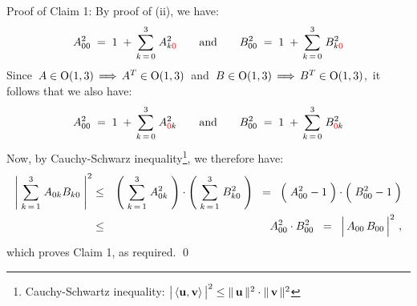 \begin{enumerate}
	\vskip 0.1cm
	\noindent
	Proof of Claim 1:\;\;
	By proof of (ii), we have:
	\begin{equation*}
	A_{{\color{black}0}0}^{2}
	\; = \;
		1
		\; + \,
		\overset{3}{\underset{k\,=\,0}{\sum}}\;
		A_{k{\color{red}0}}^{2}
	\quad\quad\textnormal{and}\quad\quad
	B_{{\color{black}0}0}^{2}
	\; = \;
		1
		\; + \,
		\overset{3}{\underset{k\,=\,0}{\sum}}\;
		B_{k{\color{red}0}}^{2}
	\end{equation*}
	Since
	\,$A \in \textnormal{O}(1,3) \,\Longrightarrow\, A^{T} \in \textnormal{O}(1,3)$\,
	and
	\,$B \in \textnormal{O}(1,3) \,\Longrightarrow\, B^{T} \in \textnormal{O}(1,3)$,\,
	it follows that we also have:
	\begin{equation*}
	A_{{\color{black}0}0}^{2}
	\; = \;
		1
		\; + \,
		\overset{3}{\underset{k\,=\,0}{\sum}}\;
		A_{{\color{red}0}k}^{2}
	\quad\quad\textnormal{and}\quad\quad
	B_{{\color{black}0}0}^{2}
	\; = \;
		1
		\; + \,
		\overset{3}{\underset{k\,=\,0}{\sum}}\;
		B_{{\color{red}0}k}^{2}
	\end{equation*}
	Now, by Cauchy-Schwarz inequality\footnote{Cauchy-Schwartz inequality:
	$\left\vert\,\langle \overset{{\color{white}.}}{\mathbf{u},\mathbf{v}} \rangle\,\right\vert^{2}
	\leq
	\Vert\,\mathbf{u}\,\Vert^{2} \cdot \Vert\,\mathbf{v}\,\Vert^{2}$},
	we therefore have:
	\begin{eqnarray*}
	\left\vert\;
		\overset{3}{\underset{k\,=\,1}{\sum}}\;A_{0k}B_{k0}
		\;\right\vert^{2}
	& \leq &
		\left(\;
			\overset{3}{\underset{k\,=\,1}{\sum}}\;A_{0k}^{2}
			\;\right)
		\cdot
		\left(\;
			\overset{3}{\underset{k\,=\,1}{\sum}}\;B_{k0}^{2}
			\;\right)
	\;\; = \;\;
		\left(\;
			\overset{{\color{white}.}}{A_{00}^{2}-1}
			\;\right)
		\cdot
		\left(\;
			\overset{{\color{white}.}}{B_{00}^{2}-1}
			\;\right)
	\\
	& \leq &
		A_{00}^{2} \cdot B_{00}^{2}
	\;\; = \;\;
		\left\vert\, \overset{{\color{white}.}}{A_{00}\,B_{00}} \,\right\vert^{2}\,,
	\end{eqnarray*}
	which proves Claim 1, as required.
	\qed
\end{enumerate}


